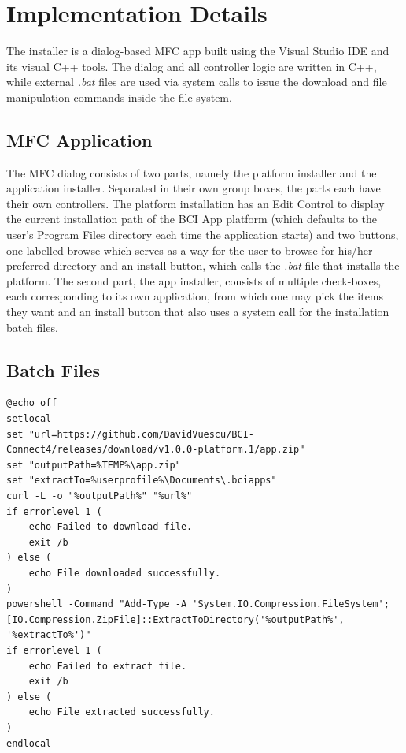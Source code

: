 \section{Implementation Details}
The installer is a dialog-based MFC app built using the Visual Studio IDE and its visual C++ tools. The dialog and all controller logic are written in C++, while external \textit{.bat} files are used via system calls to issue the download and file manipulation commands inside the file system.

\subsection{MFC Application}
The MFC dialog consists of two parts, namely the platform installer and the application installer. Separated in their own group boxes, the parts each have their own controllers. The platform installation has an Edit Control to display the current installation path of the BCI App platform (which defaults to the user's Program Files directory each time the application starts) and two buttons, one labelled browse which serves as a way for the user to browse for his/her preferred directory and an install button, which calls the \textit{.bat} file that installs the platform. The second part, the app installer, consists of multiple check-boxes, each corresponding to its own application, from which one may pick the items they want and an install button that also uses a system call for the installation batch files. 

\subsection{Batch Files}
\begin{lstlisting}[language={[Sharp]C}, caption={c4.bat, the script file used for installing the Connect4 Game}, label={Script}]
@echo off
setlocal
set "url=https://github.com/DavidVuescu/BCI-Connect4/releases/download/v1.0.0-platform.1/app.zip"
set "outputPath=%TEMP%\app.zip"
set "extractTo=%userprofile%\Documents\.bciapps"
curl -L -o "%outputPath%" "%url%"
if errorlevel 1 (
    echo Failed to download file.
    exit /b
) else (
    echo File downloaded successfully.
)
powershell -Command "Add-Type -A 'System.IO.Compression.FileSystem'; [IO.Compression.ZipFile]::ExtractToDirectory('%outputPath%', '%extractTo%')"
if errorlevel 1 (
    echo Failed to extract file.
    exit /b
) else (
    echo File extracted successfully.
)
endlocal
\end{lstlisting}


